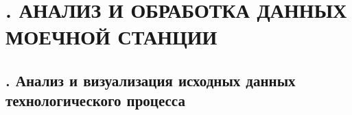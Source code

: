 \setcounter{chaptercntr}{3}

\sectionbreak \section*{
  \gostTitleFont
  \redline
  \thechaptercntr .
  АНАЛИЗ И ОБРАБОТКА ДАННЫХ МОЕЧНОЙ СТАНЦИИ
}

\subtitlespace

\subsection*{ 
  \gostTitleFont
  \redline
  \thechaptercntr .\thesubchaptercntr \spc
  Анализ и визуализация исходных данных технологического процесса
} \addtocounter{subchaptercntr}{1}

\titlespace

